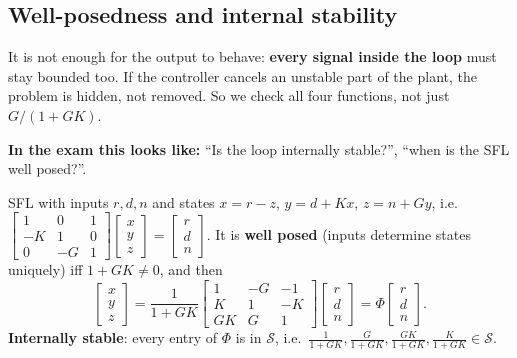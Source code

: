 \subsection{Well-posedness and internal stability \texorpdfstring{}{}}\label{sec:internal}\label{ss:5-7}
\begin{plainbox}
It is not enough for the output to behave: \textbf{every signal inside the loop} must stay bounded too. If the controller cancels an
unstable part of the plant, the problem is hidden, not removed. So we check all four functions, not just $G/(1+GK)$.
\par\smallskip\textbf{In the exam this looks like:} ``Is the loop internally stable?'', ``when is the SFL well posed?''.
\end{plainbox}
\begin{thmbox}[title={Lemma 0.51}]
SFL with inputs $r,d,n$ and states $x=r-z$, $y=d+Kx$, $z=n+Gy$, i.e.\ $\begin{bmatrix}1&0&1\\-K&1&0\\0&-G&1\end{bmatrix}\begin{bmatrix}x\\y\\z\end{bmatrix}=\begin{bmatrix}r\\d\\n\end{bmatrix}$.
It is \textbf{well posed} (inputs determine states uniquely) iff $1+GK\neq0$, and then
\[\begin{bmatrix}x\\y\\z\end{bmatrix}=\frac1{1+GK}\begin{bmatrix}1&-G&-1\\K&1&-K\\GK&G&1\end{bmatrix}\begin{bmatrix}r\\d\\n\end{bmatrix}=\Phi\begin{bmatrix}r\\d\\n\end{bmatrix}.\]
\textbf{Internally stable}: every entry of $\Phi$ is in $\mathcal S$, i.e.\ $\frac1{1+GK},\frac G{1+GK},\frac{GK}{1+GK},\frac K{1+GK}\in\mathcal S$.
\end{thmbox}
